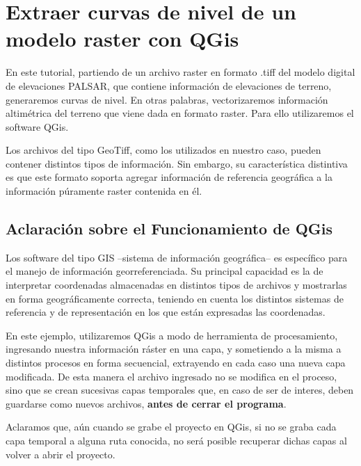 \documentclass[12pt,]{extarticle}
\begin{document}
\hypertarget{extraer-curvas-de-nivel-de-un-modelo-raster-con-qgis}{%
\section{Extraer curvas de nivel de un modelo raster con
QGis}\label{extraer-curvas-de-nivel-de-un-modelo-raster-con-qgis}}

En este tutorial, partiendo de un archivo raster en formato .tiff del
modelo digital de elevaciones PALSAR, que contiene información de
elevaciones de terreno, generaremos curvas de nivel. En otras palabras,
vectorizaremos información altimétrica del terreno que viene dada en
formato raster. Para ello utilizaremos el software QGis.

Los archivos del tipo GeoTiff, como los utilizados en nuestro caso,
pueden contener distintos tipos de información. Sin embargo, su
característica distintiva es que este formato soporta agregar
información de referencia geográfica a la información púramente raster
contenida en él.

\hypertarget{aclaraciuxf3n-sobre-el-funcionamiento-de-qgis}{%
\subsection{Aclaración sobre el Funcionamiento de
QGis}\label{aclaraciuxf3n-sobre-el-funcionamiento-de-qgis}}

Los software del tipo GIS --sistema de información geográfica-- es
específico para el manejo de información georreferenciada. Su principal
capacidad es la de interpretar coordenadas almacenadas en distintos
tipos de archivos y mostrarlas en forma geográficamente correcta,
teniendo en cuenta los distintos sistemas de referencia y de
representación en los que están expresadas las coordenadas.

En este ejemplo, utilizaremos QGis a modo de herramienta de
procesamiento, ingresando nuestra información ráster en una capa, y
sometiendo a la misma a distintos procesos en forma secuencial,
extrayendo en cada caso una nueva capa modificada. De esta manera el
archivo ingresado no se modifica en el proceso, sino que se crean
sucesivas capas temporales que, en caso de ser de interes, deben
guardarse como nuevos archivos, \textbf{antes de cerrar el programa}.

Aclaramos que, aún cuando se grabe el proyecto en QGis, si no se graba
cada capa temporal a alguna ruta conocida, no será posible recuperar
dichas capas al volver a abrir el proyecto.
\end{document}

